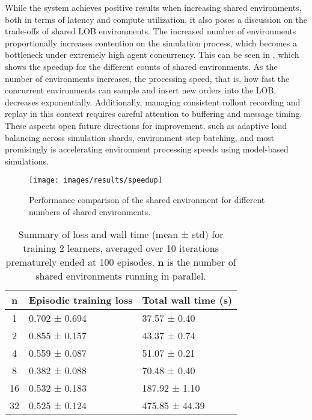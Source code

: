 While the system achieves positive results when increasing shared environments, both in terms of latency and compute utilization,
it also poses a discussion on the trade-offs of shared LOB environments.
The increased number of environments proportionally increases contention on the simulation process, which becomes a bottleneck under extremely high agent concurrency.
This can be seen in , which shows the speedup for the different counts of shared environments.
As the number of environments increases, the processing speed, that is, how fast the concurrent environments can sample and insert new orders into the LOB,
decreases exponentially.
Additionally, managing consistent rollout recording and replay in this context requires careful attention to buffering and message timing.
These aspects open future directions for improvement, such as adaptive load balancing across simulation shards, environment step batching,
and most promisingly is accelerating environment processing speeds using model-based simulations.

\begin{figure}
    \centering
    \texttt{[image: images/results/speedup]}
    \caption{Performance comparison of the shared environment for different numbers of shared environments.}
    \label{fig:speedup}
\end{figure}

\begin{table}[h!]
    \centering
    \renewcommand{\arraystretch}{1.2}
    \begin{tabularx}{\textwidth}{|c|X|X|}
        \hline
        \textbf{n} & \textbf{Episodic training loss} & \textbf{Total wall time (s)} \\
        \hline
        1          & 0.702 ± 0.694                 & 37.57 ± 0.40             \\
        2          & 0.855 ± 0.157                 & 43.37 ± 0.74             \\
        4          & 0.559 ± 0.087                 & 51.07 ± 0.21             \\
        8          & 0.382 ± 0.088                 & 70.48 ± 0.40             \\
        16         & 0.532 ± 0.183                 & 187.92 ± 1.10            \\
        32         & 0.525 ± 0.124                 & 475.85 ± 44.39           \\
        \hline
    \end{tabularx}
    \caption{
        Summary of loss and wall time (mean ± std) for training $2$ learners, averaged over 10 iterations prematurely ended at 100 episodes.
        $\textbf{n}$ is the number of shared environments running in parallel.
    }
    \label{tab:summary}
\end{table}



